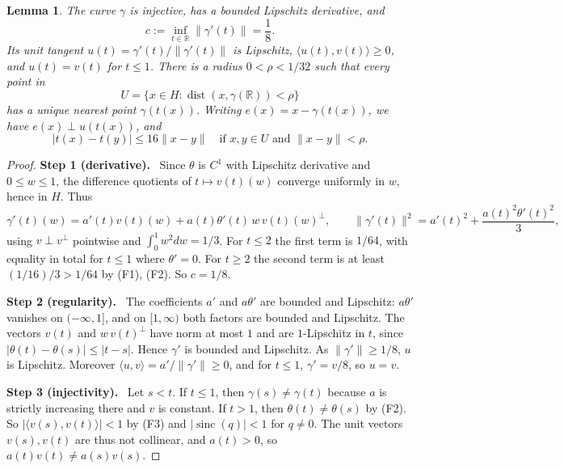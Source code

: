 \documentclass[11pt]{article}
\newcommand{\R}{\mathbb R}
\newcommand{\norm}[1]{\lVert #1\rVert}
\newcommand{\ip}[2]{\langle #1,#2\rangle}
\DeclareMathOperator{\dist}{dist}
\DeclareMathOperator{\sinc}{sinc}
\newcommand{\step}[1]{\par\smallskip\noindent\textbf{Step #1.}\ }
\newtheorem{lemma}[theorem]{Lemma}
\theoremstyle{definition}
\numberwithin{equation}{section}
\begin{document}
\begin{lemma}\label{aux:tube}
The curve $\gamma$ is injective, has a bounded Lipschitz derivative, and
\[
 c:=\inf_{t\in\R}\norm{\gamma'(t)}=\frac18.
\]
Its unit tangent $u(t)=\gamma'(t)/\norm{\gamma'(t)}$ is Lipschitz,
$\ip{u(t)}{v(t)}\ge0$, and $u(t)=v(t)$ for $t\le1$. There is a radius
$0<\rho<1/32$ such that every point in
\[
 U=\{x\in H:\dist(x,\gamma(\R))<\rho\}
\]
has a unique nearest point $\gamma(t(x))$. Writing $e(x)=x-\gamma(t(x))$,
we have $e(x)\perp u(t(x))$, and
\begin{equation}\label{aux:parameter}
 |t(x)-t(y)|\le16\norm{x-y}
 \quad\text{if }x,y\in U\text{ and }\norm{x-y}<\rho.
\end{equation}
\end{lemma}

\begin{proof}
\step{1 (derivative)} Since $\theta$ is $C^1$ with Lipschitz derivative and
$0\le w\le1$, the difference quotients of $t\mapsto v(t)(w)$ converge
uniformly in $w$, hence in $H$. Thus
\[
 \gamma'(t)(w)=a'(t)v(t)(w)+a(t)\theta'(t)\,w\,v(t)(w)^\perp,\qquad
 \norm{\gamma'(t)}^2=a'(t)^2+\frac{a(t)^2\theta'(t)^2}{3},
\]
using $v\perp v^\perp$ pointwise and $\int_0^1w^2dw=1/3$. For $t\le2$ the
first term is $1/64$, with equality in total for $t\le1$ where $\theta'=0$.
For $t\ge2$ the second term is at least $(1/16)/3>1/64$ by (F1), (F2). So
$c=1/8$.

\step{2 (regularity)} The coefficients $a'$ and $a\theta'$ are bounded and
Lipschitz: $a\theta'$ vanishes on $(-\infty,1]$, and on $[1,\infty)$ both
factors are bounded and Lipschitz. The vectors $v(t)$ and $w\,v(t)^\perp$
have norm at most $1$ and are $1$-Lipschitz in $t$, since
$|\theta(t)-\theta(s)|\le|t-s|$. Hence $\gamma'$ is bounded and Lipschitz.
As $\norm{\gamma'}\ge1/8$, $u$ is Lipschitz. Moreover
$\ip{u}{v}=a'/\norm{\gamma'}\ge0$, and for $t\le1$, $\gamma'=v/8$, so $u=v$.

\step{3 (injectivity)} Let $s<t$. If $t\le1$, then $\gamma(s)\ne\gamma(t)$
because $a$ is strictly increasing there and $v$ is constant. If $t>1$,
then $\theta(t)\ne\theta(s)$ by (F2). So $|\ip{v(s)}{v(t)}|<1$ by (F3) and
$|\sinc(q)|<1$ for $q\ne0$. The unit vectors $v(s),v(t)$ are thus not
collinear, and $a(t)>0$, so $a(t)v(t)\ne a(s)v(s)$.


\end{proof}
\end{document}
